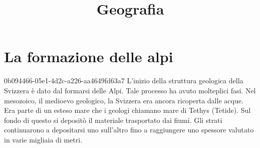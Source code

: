 \documentclass[preview]{standalone}
\begin{document}
\title{Geografia}
\genpage

\section{La formazione delle alpi}

\begin{snippet}{0b094466-05e1-4d2c-a226-aa4649fd63a7}
    L'inizio della struttura geologica della Svizzera è dato dal formarsi delle Alpi. Tale processo
    ha avuto molteplici fasi. Nel mesozoico, il medioevo geologico, la Svizzera era ancora ricoperta
    dalle acque. Era parte di un esteso mare che i geologi chiamano mare di Tethys (Tetide). Sul
    fondo di questo si depositò il materiale trasportato dai fiumi. Gli strati continuarono a
    depositarsi uno sull'altro fino a raggiungere uno spessore valutato in varie migliaia di metri.


\end{snippet}
\end{document}
